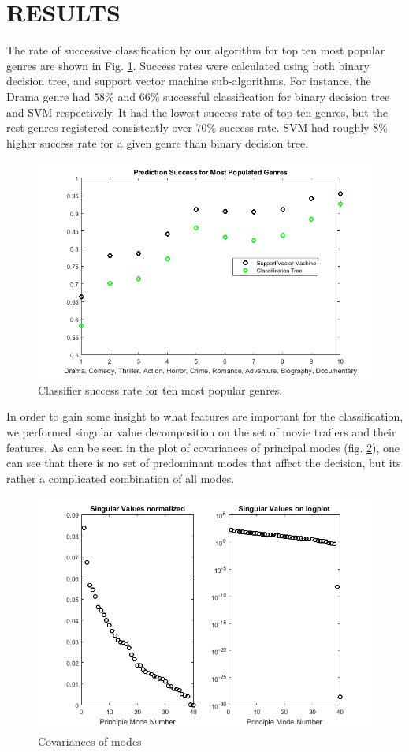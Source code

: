 \documentclass[letterpaper, 10 pt, conference]{ieeeconf}  %
\begin{document}
\section{RESULTS}
The rate of successive classification by our algorithm for top ten most popular genres are shown in Fig. \ref{f:success_rate}. Success rates were calculated using both binary decision tree, and support vector machine sub-algorithms. For instance, the Drama genre had 58\% and 66\% successful classification for binary decision tree and SVM respectively. It had the lowest success rate of top-ten-genres, but the rest genres registered consistently over 70\% success rate. SVM had roughly 8\% higher success rate for a given genre than binary decision tree.\\
\begin{figure}[h]
	\centering
	\includegraphics[width=\columnwidth]{TreeVsSVM.png}
	\caption{Classifier success rate for ten most popular genres.}
	\label{f:success_rate}
\end{figure}
In order to gain some insight to what features are important for the classification, we performed singular value decomposition on the set of movie trailers and their features. As can be seen in the plot of covariances of principal modes (fig. \ref{f:mode_covar}), one can see that there is no set of predominant modes that affect the decision, but its rather a complicated combination of all modes.
\begin{figure}[h]
	\centering
	\includegraphics[width=\columnwidth]{singValues.png}
	\caption{Covariances of modes}
	\label{f:mode_covar}
\end{figure}
\end{document}
